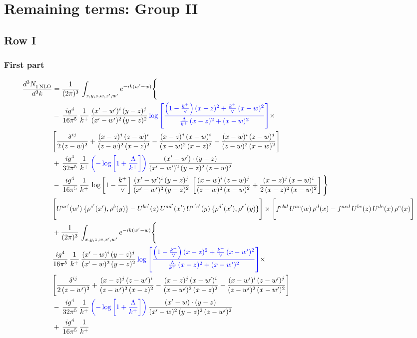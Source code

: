 \documentclass[9pt]{article}
\newcommand{\new}[1]{{\color{blue}#1}}
\numberwithin{equation}{section}
\begin{document}
\section{Remaining terms: Group II}
\subsection{Row I}
\subsubsection{First part}
\begin{align}
 \frac{d^{3}N_{1\,\rm NLO}^{\rm}}{d^{3}k}  & =    \frac{1}{(2\pi)^{3}}\,\int_{x,y,z,w,x',w^{\prime}} e^{-ik(w^{\prime}-w)}\Bigg\{ \notag \\ & -\, \frac{ig^{4}}{16\pi^{5}}\,\frac{1}{k^{+}}\, \frac{(x'-w')^{i}\,(y-z)^{j}}{(x'-w')^{2}\,(y-z)^{2}}\,\new{\log{\left[\frac{\left(1-\frac{k^{+}}{\vee}\right)(x-z)^{2}+\frac{k^{+}}{\vee}\,(x-w)^{2}}{\frac{\Lambda}{k^{+}}\,(x-z)^{2}+(x-w)^{2}}\right]}}\times\notag \\ &  \Bigg[\frac{\delta^{ij}}{2\,(z-w)^{2}}+\frac{(x-z)^{j}\,(z-w)^{i}}{(z-w)^{2}\,(x-z)^{2}}-\frac{(x-z)^{j}\,(x-w)^{i}}{(x-w)^{2}\,(x-z)^{2}}-\frac{(x-w)^{i}\,(z-w)^{j}}{(z-w)^{2}\,(x-w)^{2}}\Bigg]\notag \\ & +\,\frac{ig^{4}}{32\pi^{5}}\,\frac{1}{k^{+}}\,\new{\left(-\log{\left[1+\frac{\Lambda}{k^{+}}\right]}\right)}\, \frac{(x'-w')\cdot (y-z)}{(x'-w')^{2}\,(y-z)^{2}\,(z-w)^{2}}\notag \\ & -\, \frac{ig^{4}}{16\pi^{5}}\,\frac{1}{k^{+}}\, \log{\left[1-\frac{k^{+}}{\vee}\right]}\,\frac{(x'-w')^{i}\,(y-z)^{j}}{(x'-w')^{2}\,(y-z)^{2}}\,\left[\frac{(x-w)^{i}\,(z-w)^{j}}{(z-w)^{2}\,(x-w)^{2}}+\frac{(x-z)^{j}\,(x-w)^{i}}{2\,(x-z)^{2}\, (x-w)^{2}}\right]\Bigg\} \notag \\ & \Bigg[U^{ac'}(w')\,\{\rho^{c'}(x'),\rho^{b}(y)\}-U^{bc'}(z)\,U^{ad'}(x')\,U^{c'e'}(y)\, \{\rho^{d'}(x'),\rho^{e'}(y)\}\Bigg]\times \Bigg[f^{cbd}\,U^{ac}(w)\,\rho^{d}(x)-f^{acd}\, U^{bc}(z)\,U^{de}(x)\,\rho^{e}(x)\Bigg]\notag \\ & + \frac{1}{(2\pi)^{3}}\,\int_{x,y,z,w,x',w^{\prime}} e^{-ik(w^{\prime}-w)}\Bigg\{ \notag \\ &  \frac{ig^{4}}{16\pi^{5}}\,\frac{1}{k^{+}}\, \frac{(x'-w)^{i}\,(y-z)^{j}}{(x'-w)^{2}\,(y-z)^{2}}\,\new{\log{\left[\frac{\left(1-\frac{k^{+}}{\vee}\right)(x-z)^{2}+\frac{k^{+}}{\vee}\,(x-w')^{2}}{\frac{\Lambda}{k^{+}}\,(x-z)^{2}+(x-w')^{2}}\right]}}\times\notag \\ &  \Bigg[\frac{\delta^{ij}}{2\,(z-w')^{2}}+\frac{(x-z)^{j}\,(z-w')^{i}}{(z-w')^{2}\,(x-z)^{2}}-\frac{(x-z)^{j}\,(x-w')^{i}}{(x-w')^{2}\,(x-z)^{2}}-\frac{(x-w')^{i}\,(z-w')^{j}}{(z-w')^{2}\,(x-w')^{2}}\Bigg]\notag \\ & -\,\frac{ig^{4}}{32\pi^{5}}\,\frac{1}{k^{+}}\,\new{\left(-\log{\left[1+\frac{\Lambda}{k^{+}}\right]}\right)}\, \frac{(x'-w)\cdot (y-z)}{(x'-w)^{2}\,(y-z)^{2}\,(z-w')^{2}}\notag \\ & +\,\frac{ig^{4}}{16\pi^{5}}\,\frac{1}{k^{+}}\, 
\end{align}
\end{document}
